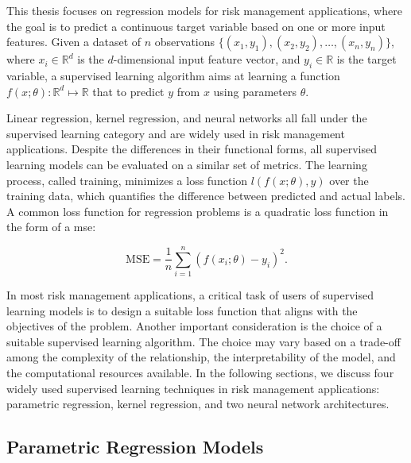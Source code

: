 This thesis focuses on regression models for risk management applications, where the goal is to predict a continuous target variable based on one or more input features.
Given a dataset of $n$ observations $\{(x_1, y_1), (x_2, y_2), \ldots, (x_n, y_n)\}$, where $x_i \in \mathbb{R}^d$ is the $d$-dimensional input feature vector, and $y_i \in \mathbb{R}$ is the target variable, a supervised learning algorithm aims at learning a function $f(x;\theta): \mathbb{R}^d \mapsto \mathbb{R}$ that to predict $y$ from $x$ using parameters $\theta$.

Linear regression, kernel regression, and neural networks all fall under the supervised learning category and are widely used in risk management applications.
Despite the differences in their functional forms, all supervised learning models can be evaluated on a similar set of metrics.
The learning process, called training, minimizes a loss function $l(f(x; \theta),y)$ over the training data, which quantifies the difference between predicted and actual labels.
A common loss function for regression problems is a quadratic loss function in the form of a \gls{mse}:

\begin{equation} \label{eq:mse}
    \text{MSE} = \frac{1}{n} \sum_{i=1}^{n} (f(x_i;\theta) - y_i)^2.
\end{equation}

In most risk management applications, a critical task of users of supervised learning models is to design a suitable loss function that aligns with the objectives of the problem.
Another important consideration is the choice of a suitable supervised learning algorithm.
The choice may vary based on a trade-off among the complexity of the relationship, the interpretability of the model, and the computational resources available.
In the following sections, we discuss four widely used supervised learning techniques in risk management applications: parametric regression, kernel regression, and two neural network architectures.

\subsection{Parametric Regression Models}

